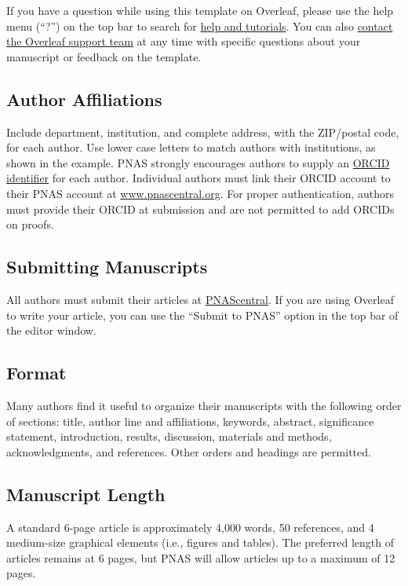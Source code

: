 \documentclass[9pt,twocolumn,twoside]{pnas-new}
\begin{document}
If you have a question while using this template on Overleaf, please use the help menu (``?'') on the top bar to search for \href{https://www.overleaf.com/help}{help and tutorials}. You can also \href{https://www.overleaf.com/contact}{contact the Overleaf support team} at any time with specific questions about your manuscript or feedback on the template.

\subsection*{Author Affiliations}

Include department, institution, and complete address, with the ZIP/postal code, for each author. Use lower case letters to match authors with institutions, as shown in the example. PNAS strongly encourages authors to supply an \href{https://orcid.org/}{ORCID identifier} for each author. Individual authors must link their ORCID account to their PNAS account at \href{http://www.pnascentral.org/}{www.pnascentral.org}. For proper authentication, authors must provide their ORCID at submission and are not permitted to add ORCIDs on proofs.

\subsection*{Submitting Manuscripts}

All authors must submit their articles at \href{http://www.pnascentral.org/cgi-bin/main.plex}{PNAScentral}. If you are using Overleaf to write your article, you can use the ``Submit to PNAS'' option in the top bar of the editor window.

\subsection*{Format}

Many authors find it useful to organize their manuscripts with the following order of sections: title, author line and affiliations, keywords, abstract, significance statement, introduction, results, discussion, materials and methods, acknowledgments, and references. Other orders and headings are permitted.

\subsection*{Manuscript Length}

A standard 6-page article is approximately 4,000 words, 50 references, and 4 medium-size graphical elements (i.e., figures and tables). The preferred length of articles remains at 6 pages, but PNAS will allow articles up to a maximum of 12 pages.
\end{document}
